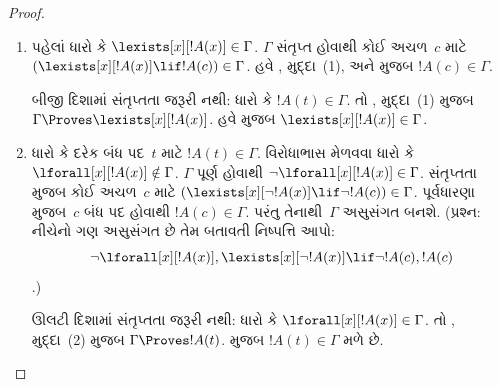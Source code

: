 \begin{proof}
  \begin{enumerate}
  \item %
    પહેલાં ધારો કે $\lexists[x][!A(x)]
      \in \Gamma$. $\Gamma$ સંતૃપ્ત હોવાથી કોઈ અચળ~$c$ માટે
      $(\lexists[x][!A(x)] \lif !A(c)) \in \Gamma$. હવે
      , મુદ્દા~(1),
      અને  મુજબ
      $!A(c) \in \Gamma$.

    બીજી દિશામાં સંતૃપ્તતા જરૂરી નથી: ધારો કે $!A(t) \in \Gamma$.
    તો
      , મુદ્દા~(1) મુજબ
    $\Gamma \Proves \lexists[x][!A(x)]$. હવે
     મુજબ
    $\lexists[x][!A(x)] \in \Gamma$.
  \item %
    ધારો કે દરેક બંધ પદ~$t$ માટે $!A(t) \in
      \Gamma$. વિરોધાભાસ મેળવવા ધારો કે $\lforall[x][!A(x)] \notin
      \Gamma$. $\Gamma$ પૂર્ણ હોવાથી $\lnot\lforall[x][!A(x)] \in
      \Gamma$. સંતૃપ્તતા મુજબ કોઈ અચળ~$c$ માટે
      $(\lexists[x][\lnot !A(x)] \lif \lnot !A(c)) \in
        \Gamma$. પૂર્વધારણા મુજબ~$c$ બંધ પદ હોવાથી $!A(c) \in
      \Gamma$. પરંતુ તેનાથી~$\Gamma$ અસુસંગત બનશે. (પ્રશ્ન: નીચેનો
      ગણ અસુસંગત છે તેમ બતાવતી નિષ્પત્તિ આપો:
      \[
      \lnot \lforall[x][!A(x)],
      \lexists[x][\lnot !A(x)] \lif \lnot
        !A(c), !A(c)
      \]
      .)

      ઊલટી દિશામાં સંતૃપ્તતા જરૂરી નથી: ધારો કે
      $\lforall[x][!A(x)] \in \Gamma$. તો
      , મુદ્દા~(2) મુજબ
      $\Gamma \Proves !A(t)$.  મુજબ
      $!A(t) \in \Gamma$ મળે છે.
  \end{enumerate}
\end{proof}
\endgroup


\begingroup
\makeatletter{}\makeatother


\label{guunit:OLP-0131}


